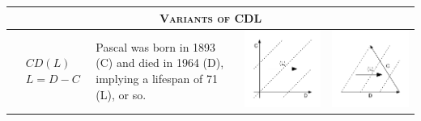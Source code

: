 \documentclass[11pt,oneside,a4paper]{article} %
\begin{document}
\begin{center}
\begin{longtable}{m{}m{}m{}m{}}
  \midrule
  \midrule
  \multicolumn{4}{c}{\textsc{Variants of CDL}}
  \\
  \midrule
  $$\begin{aligned}
    &CD(L) \\
    &L = D - C
  \end{aligned}$$ &
  Pascal was born in 1893 (C) and died in 1964 (D), implying a lifespan of 71
  (L), or so.
  & \includegraphics[width = \linewidth]{Figures/JonasTable/CDl.pdf} &
  \includegraphics[width = \linewidth]{Figures/JonasTable/CDl_iso.pdf}  \\

\end{longtable}
\end{center}
\end{document}
